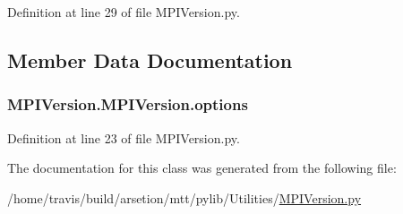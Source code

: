 Definition at line 29 of file M\-P\-I\-Version.\-py.



\subsection{Member Data Documentation}
\hypertarget{classMPIVersion_1_1MPIVersion_a86d77c651262785c248d819c9cfed3b1}{
\subsubsection[{options}]{\setlength{\rightskip}{0pt plus 5cm}M\-P\-I\-Version.\-M\-P\-I\-Version.\-options}}\label{classMPIVersion_1_1MPIVersion_a86d77c651262785c248d819c9cfed3b1}


Definition at line 23 of file M\-P\-I\-Version.\-py.



The documentation for this class was generated from the following file\-:\begin{DoxyCompactItemize}
\item 
/home/travis/build/arsetion/mtt/pylib/\-Utilities/\hyperlink{MPIVersion_8py}{M\-P\-I\-Version.\-py}\end{DoxyCompactItemize}
